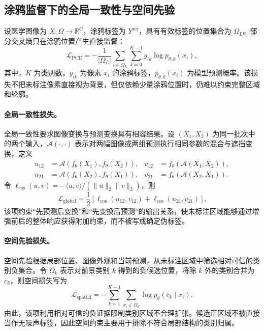\subsection{涂鸦监督下的全局一致性与空间先验}
\label{subsec:prior-scribble-foundation}

设医学图像为 $X:\Omega\rightarrow\mathbb{R}^{C}$，涂鸦标签为 $Y^{\mathrm{scr}}$，具有有效标签的位置集合为 $\Omega_L$。部分交叉熵只在涂鸦位置产生直接监督：
\begin{equation}
\mathcal{L}_{\mathrm{PCE}}
=
-\frac{1}{|\Omega_L|}
\sum_{i\in\Omega_L}
\sum_{k=0}^{K-1}
y_{ik}\log p_{\theta,k}(x_i),
\label{eq:scribblecl-pce}
\end{equation}
其中，$K$ 为类别数，$y_{ik}$ 为像素 $x_i$ 的涂鸦标签，$p_{\theta,k}(x_i)$ 为模型预测概率。该损失不把未标注像素直接视为背景，但仅依赖少量涂鸦位置时，仍难以约束完整区域和轮廓。

\paragraph{全局一致性损失。}
全局一致性要求图像变换与预测变换具有相容结果\cite{zhang2026zscribbleseg}。设 $(X_1,X_2)$ 为同一批次中的两个输入，$\mathcal{A}(\cdot,\cdot)$ 表示对两幅图像或两组预测执行相同参数的混合与遮挡变换，定义
\begin{equation}
\begin{aligned}
u_{12}&=\mathcal{A}\!\left(f_{\theta}(X_1),f_{\theta}(X_2)\right),
&v_{12}&=f_{\theta}\!\left(\mathcal{A}(X_1,X_2)\right),\\
u_{21}&=\mathcal{A}\!\left(f_{\theta}(X_2),f_{\theta}(X_1)\right),
&v_{21}&=f_{\theta}\!\left(\mathcal{A}(X_2,X_1)\right).
\end{aligned}
\label{eq:scribblecl-global-pairs}
\end{equation}
令
$\ell_{\cos}(u,v)=-\langle u,v\rangle/(\|u\|_2\|v\|_2)$，则
\begin{equation}
\mathcal{L}_{\mathrm{global}}
=
\frac{1}{2}
\left[
\ell_{\cos}(u_{12},v_{12})
+
\ell_{\cos}(u_{21},v_{21})
\right].
\label{eq:scribblecl-global-loss}
\end{equation}
该项约束“先预测后变换”和“先变换后预测”的输出关系，使未标注区域能够通过增强前后的整体响应获得附加约束，而不被写成确定伪标签\cite{zhang2026zscribbleseg}。

\paragraph{空间先验损失。}
空间先验根据局部位置、图像外观和当前预测，从未标注区域中筛选相对可信的类别负集合。令 $\overline{\Omega}_k$ 表示对前景类别 $k$ 得到的负候选位置，将除 $k$ 外的类别合并为 $\overline c_k$，则空间损失写为
\begin{equation}
\mathcal{L}_{\mathrm{spatial}}
=
-
\sum_{k=1}^{K-1}
\sum_{x_i\in\overline{\Omega}_k}
\log p_{\theta}(\overline c_k\mid x_i).
\label{eq:scribblecl-spatial-loss}
\end{equation}
由此，该项利用相对可信的负证据限制类别区域不合理扩张。候选正区域不被直接当作无噪声标签，因此空间约束主要用于排除不符合局部结构的类别归属\cite{zhang2026zscribbleseg}。

